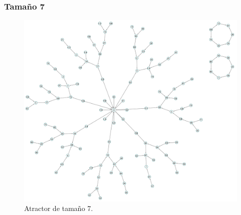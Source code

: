 \documentclass[11pt]{article}
\begin{document}
			\subsubsection{Tamaño 7}
			\begin{figure}[H]
			\centering
			\includegraphics[scale=0.1]{resources/Atractores22/atractor_22_size_7.png}
			\caption{Atractor de tamaño 7.}\label{fig:picture}
			\end{figure}
\end{document}
